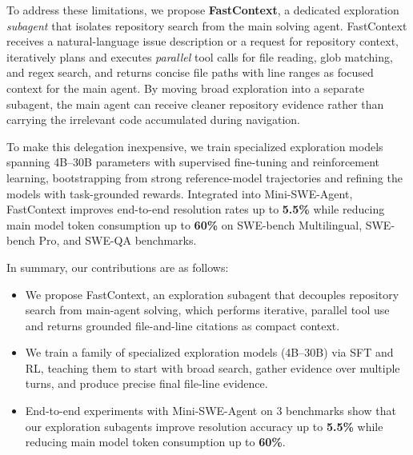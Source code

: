\documentclass[11pt]{article}
\newcommand{\approach}{{FastContext}\xspace}
\begin{document}
To address these limitations, we propose \textbf{\approach}, a dedicated exploration \emph{subagent} that isolates repository search from the main solving agent.
\approach receives a natural-language issue description or a request for repository context, iteratively plans and executes \emph{parallel} tool calls for file reading, glob matching, and regex search, and returns concise file paths with line ranges as focused context for the main agent.
By moving broad exploration into a separate subagent, the main agent can receive cleaner repository evidence rather than carrying the irrelevant code accumulated during navigation.

To make this delegation inexpensive, we train specialized exploration models spanning 4B--30B parameters with supervised fine-tuning and reinforcement learning, bootstrapping from strong reference-model trajectories and refining the models with task-grounded rewards.
Integrated into Mini-SWE-Agent, \approach improves end-to-end resolution rates up to \textbf{5.5\%} while reducing main model token consumption up to \textbf{60\%} on SWE-bench Multilingual, SWE-bench Pro, and SWE-QA benchmarks.

In summary, our contributions are as follows:
\begin{itemize}
\vspace{-2mm}
  \item We propose \approach, an exploration subagent that decouples repository search from main-agent solving, which performs iterative, parallel tool use and returns grounded file-and-line citations as compact context.
  \vspace{-2mm}
  \item We train a family of specialized exploration models (4B--30B) via SFT and RL, teaching them to start with broad search, gather evidence over multiple turns, and produce precise final file-line evidence.
  \vspace{-2mm}
  \item End-to-end experiments with Mini-SWE-Agent on 3 benchmarks show that our exploration subagents improve resolution accuracy up to \textbf{5.5\%} while reducing main model token consumption up to \textbf{60\%}.
\end{itemize}




\end{document}
